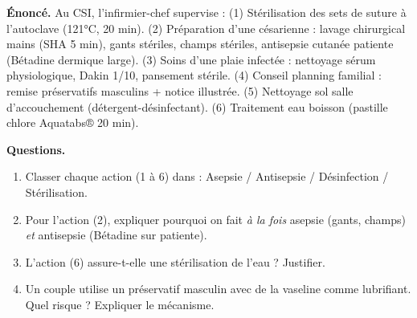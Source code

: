 \documentclass[11pt]{article}
\begin{document}
\begin{exoresolu}
\textbf{Énoncé.} Au CSI, l'infirmier-chef supervise : (1) Stérilisation des sets de suture à l'autoclave (121°C, 20 min). (2) Préparation d'une césarienne : lavage chirurgical mains (SHA 5 min), gants stériles, champs stériles, antisepsie cutanée patiente (Bétadine dermique large). (3) Soins d'une plaie infectée : nettoyage sérum physiologique, Dakin 1/10, pansement stérile. (4) Conseil planning familial : remise préservatifs masculins + notice illustrée. (5) Nettoyage sol salle d'accouchement (détergent-désinfectant). (6) Traitement eau boisson (pastille chlore Aquatabs® 20 min).

\textbf{Questions.}
\begin{enumerate}
    \item Classer chaque action (1 à 6) dans : Asepsie / Antisepsie / Désinfection / Stérilisation.
    \item Pour l'action (2), expliquer pourquoi on fait \emph{à la fois} asepsie (gants, champs) \emph{et} antisepsie (Bétadine sur patiente).
    \item L'action (6) assure-t-elle une stérilisation de l'eau ? Justifier.
    \item Un couple utilise un préservatif masculin avec de la vaseline comme lubrifiant. Quel risque ? Expliquer le mécanisme.
\end{enumerate}

\tcblower


\end{exoresolu}
\end{document}
